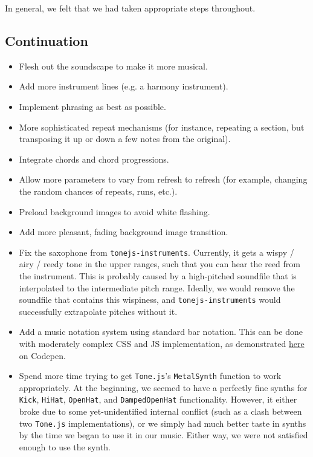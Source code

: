 \documentclass[12pt,a4paper]{article}
\newcommand{\code}{\texttt}
\newcommand{\lightcode}[1]{\colorbox{light-gray}{\texttt{#1}}}
\begin{document}
In general, we felt that we had taken appropriate steps throughout.

\subsection{Continuation}
\begin{itemize}
	\item Flesh out the soundscape to make it more musical.
	\item Add more instrument lines (e.g. a harmony instrument).
	\item Implement phrasing as best as possible.
	\item More sophisticated repeat mechanisms (for instance, repeating a section, but transposing it up or down a few notes from the original).
	\item Integrate chords and chord progressions.
	\item Allow more parameters to vary from refresh to refresh (for example, changing the random chances of repeats, runs, etc.).
	\item Preload background images to avoid white flashing.
	\item Add more pleasant, fading background image transition.
	\item Fix the saxophone from \lightcode{tonejs-instruments}. Currently, it gets a wispy / airy / reedy tone in the upper ranges, such that you can hear the reed from the instrument. This is probably caused by a high-pitched soundfile that is interpolated to the intermediate pitch range. Ideally, we would remove the soundfile that contains this wispiness, and \lightcode{tonejs-instruments} would successfully extrapolate pitches without it.
	\item Add a music notation system using standard bar notation. This can be done with moderately complex CSS and JS implementation, as demonstrated \href{https://codepen.io/laviperchik/pen/mIACq}{here} on Codepen. \cite{css-musical-notes}
	\item Spend more time trying to get \lightcode{Tone.js}'s \code{MetalSynth} function to work appropriately. At the beginning, we seemed to have a perfectly fine synths for \code{Kick}, \code{HiHat}, \code{OpenHat}, and \code{DampedOpenHat} functionality. However, it either broke due to some yet-unidentified internal conflict (such as a clash between two \lightcode{Tone.js} implementations), or we simply had much better taste in synths by the time we began to use it in our music. Either way, we were not satisfied enough to use the synth.
\end{itemize}
\end{document}
